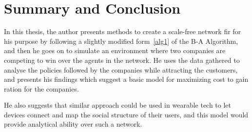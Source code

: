 
\chapter{Summary and Conclusion} %

\label{Chapter7} %


In this thesis, the author presents methods to create a scale-free network fir for his purpose by following a slightly modified form~\ref{alg1} of the B-A Algorithm, and then he goes on to simulate an environment where two companies are competing to win over the agents in the network.
He uses the data gathered to analyse the policies followed by the companies while attracting the customers, and presents his findings which suggest a basic model for maximizing cost to gain ration for the companies.

He also suggests that similar approach could be used in wearable tech to let devices connect and map the social structure of their users, and this model would provide analytical ability over such a network.

